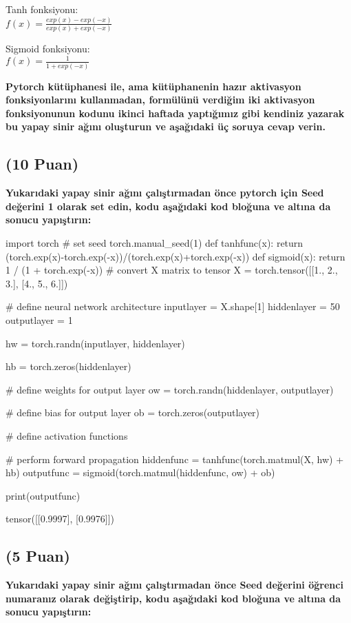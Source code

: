 \documentclass[11pt]{article}
\begin{document}
Tanh fonksiyonu:\\
$f(x) = \frac{exp(x) - exp(-x)}{exp(x) + exp(-x)}$
\vspace{.2in}

Sigmoid fonksiyonu:\\
$f(x) = \frac{1}{1 + exp(-x)}$

\vspace{.2in}
 \textbf{Pytorch kütüphanesi ile, ama kütüphanenin hazır aktivasyon fonksiyonlarını kullanmadan, formülünü verdiğim iki aktivasyon fonksiyonunun kodunu ikinci haftada yaptığımız gibi kendiniz yazarak bu yapay sinir ağını oluşturun ve aşağıdaki üç soruya cevap verin.}
 
\subsection{(10 Puan)} \textbf{Yukarıdaki yapay sinir ağını çalıştırmadan önce pytorch için Seed değerini 1 olarak set edin, kodu aşağıdaki kod bloğuna ve altına da sonucu yapıştırın:}

\begin{python}
import torch
# set seed
torch.manual_seed(1)
def tanhfunc(x):
    return (torch.exp(x)-torch.exp(-x))/(torch.exp(x)+torch.exp(-x))
def sigmoid(x):
    return 1 / (1 + torch.exp(-x))
# convert X matrix to tensor
X = torch.tensor([[1., 2., 3.], [4., 5., 6.]])

# define neural network architecture
inputlayer = X.shape[1]
hiddenlayer = 50
outputlayer = 1

hw = torch.randn(inputlayer, hiddenlayer)

hb = torch.zeros(hiddenlayer)

# define weights for output layer
ow = torch.randn(hiddenlayer, outputlayer)

# define bias for output layer
ob = torch.zeros(outputlayer)

# define activation functions

# perform forward propagation
hiddenfunc = tanhfunc(torch.matmul(X, hw) + hb)
outputfunc = sigmoid(torch.matmul(hiddenfunc, ow) + ob)

print(outputfunc)
\end{python}

tensor([[0.9997],
        [0.9976]])

\subsection{(5 Puan)} \textbf{Yukarıdaki yapay sinir ağını çalıştırmadan önce Seed değerini öğrenci numaranız olarak değiştirip, kodu aşağıdaki kod bloğuna ve altına da sonucu yapıştırın:}
\end{document}
